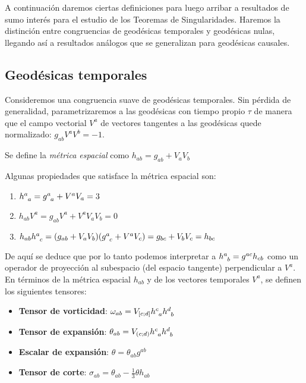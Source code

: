 A continuación daremos ciertas definiciones para luego arribar a resultados de sumo interés para el estudio de los Teoremas de Singularidades. Haremos la distinción entre congruencias de geodésicas temporales y geodésicas nulas, llegando así a resultados análogos que se generalizan para geodésicas causales.




    
\subsection{Geodésicas temporales}\label{geodesicas temporales}

Consideremos una congruencia suave de geodésicas temporales. Sin pérdida de generalidad, parametrizaremos a las geodésicas con tiempo propio $\tau$ de manera que el campo vectorial $V^a$ de vectores tangentes a las geodésicas quede normalizado: $g_{ab}V^aV^b=-1$.



\begin{definition}
Se define la \textit{métrica espacial} como $h_{ab}=g_{ab}+V_aV_b$
\end{definition}

Algunas propiedades que satisface la métrica espacial son:

\begin{enumerate}[1)]
    \item $\tensor{h}{^a_a}=\tensor{g}{^a_a}+V^aV_a=3$
    \item $h_{ab}V^a=g_{ab}V^a+V^aV_aV_b=0$
    \item $h_{ab}\tensor{h}{^a_c}=(g_{ab}+V_aV_b)(\tensor{g}{^a_c}+V^aV_c)=g_{bc}+V_bV_c=h_{bc}$
\end{enumerate}
 
 
De aquí se deduce que por lo tanto podemos interpretar a $\tensor{h}{^a_b}=g^{ac}h_{cb}$ como un operador de proyección al subespacio (del espacio tangente) perpendicular a $V^a$. En términos de la métrica espacial $h_{ab}$ y de los vectores temporales $V^a$, se definen los siguientes tensores:

\begin{itemize}
    \item \textbf{Tensor de vorticidad}: $\omega_{ab}=V_{[c;d]}\tensor{h}{^c_a}\tensor{h}{^d_b}$
    \item \textbf{Tensor de expansión}: $\theta_{ab}=V_{(c;d)}\tensor{h}{^c_a}\tensor{h}{^d_b}$
    \item \textbf{Escalar de expansión}: $\theta=\theta_{ab}g^{ab}$
    \item \textbf{Tensor de corte}: $\sigma_{ab}=\theta_{ab}-\frac{1}{3}\theta h_{ab}$
\end{itemize}


